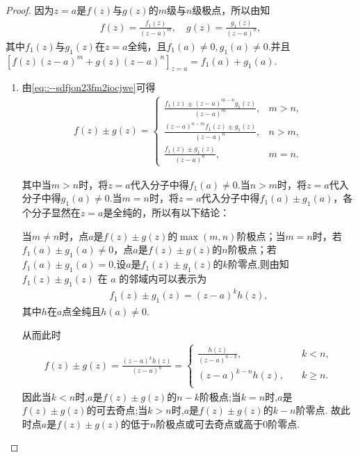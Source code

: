 \documentclass[../../main.tex]{subfiles}%
\begin{document}
\begin{proof}

因为$z=a$是$f(z)$与$g(z)$的$m$级与$n$级极点，所以由知
\begin{align}\label{eq::--sdfjon23fm2iocjwe}
f(z)=\frac{f_1(z)}{(z-a)^m},\quad g(z)=\frac{g_1(z)}{(z-a)^n},
\end{align}
其中$f_1(z)$与$g_1(z)$在$z=a$全纯，且$f_1(a)\neq0,g_1(a)\neq0$.并且$\left[ f(z)\left( z-a \right) ^m+g(z)\left( z-a \right) ^n \right] _{z=a}=f_1(a)+g_1(a).$
\begin{enumerate}[(1)]
\item 由\eqref{eq::--sdfjon23fm2iocjwe}可得
\begin{align*}
f(z)\pm g(z)=
\begin{cases}
\frac{f_1(z)\pm (z-a)^{m-n}g_1(z)}{(z-a)^m},&m>n,\\
\frac{(z-a)^{n-m}f_1(z)\pm g_1(z)}{(z-a)^n},&n>m,\\
\frac{f_1(z)\pm g_1(z)}{(z-a)^n},&m=n.
\end{cases}
\end{align*}

其中当$m>n$时，将$z=a$代入分子中得$f_1(a)\neq0$.当$n>m$时，将$z=a$代入分子中得$g_1(a)\neq0$.当$m=n$时，将$z=a$代入分子中得$f_1(a)\pm g_1(a)$，各个分子显然在$z=a$是全纯的，所以有以下结论：

当$m\neq n$时，点$a$是$f(z)\pm g(z)$的$\max(m,n)$阶极点；当$m=n$时，若$f_1(a)\pm g_1(a)\neq0$，点$a$是$f(z)\pm g(z)$的$n$阶极点；若$f_1(a)\pm g_1(a)=0$,设$a$是$f_1(z)\pm g_1(z)$的$k$阶零点,则由知\( f_1(z)\pm g_1(z) \) 在 \( a \) 的邻域内可以表示为
\begin{align*}
f_1(z)\pm g_1(z) = (z - a)^k h(z),
\end{align*}
其中$h$在$a$点全纯且$h(a)\neq 0$.

从而此时
\begin{align*}
f(z)\pm g(z)=\frac{(z-a)^kh(z)}{(z-a)^n}=\begin{cases}
\frac{h(z)}{(z-a)^{n-k}},\quad &k<n,\\
(z-a)^{k-n}h(z),\quad &k\geqslant n.\\
\end{cases}
\end{align*}
因此当$k<n$时,$a$是$f(z)\pm g(z)$的$n-k$阶极点;当$k=n$时,$a$是$f(z)\pm g(z)$的可去奇点;当$k>n$时,$a$是$f(z)\pm g(z)$的$k-n$阶零点.
故此时点$a$是$f(z)\pm g(z)$的低于$n$阶极点或可去奇点或高于$0$阶零点.


\end{enumerate}
\end{proof}
\end{document}
